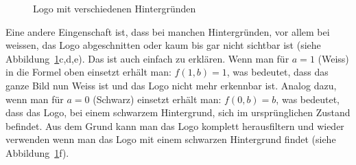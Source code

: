 \documentclass[12pt,a4paper]{report}
\begin{document}
\begin{figure}[h]
    \qquad
    \qquad
    \caption{Logo mit verschiedenen Hintergründen}%
    \label{fig:logo5}%
\end{figure}
Eine andere Eingenschaft ist, dass bei manchen Hintergründen,
vor allem bei weissen, das Logo abgeschnitten oder kaum bis gar nicht sichtbar ist (siehe Abbildung~\ref{fig:logo5}c,d,e).
Das ist auch einfach zu erklären.
Wenn man für $a = 1$ (Weiss) in die Formel oben einsetzt erhält man: $f(1, b) = 1$, was bedeutet, dass das ganze Bild nun Weiss ist und das Logo nicht mehr erkennbar ist.
Analog dazu, wenn man für $a = 0$ (Schwarz) einsetzt erhält man: $f(0, b) = b$, was bedeutet, dass das Logo, bei einem schwarzem Hintergrund,
sich im ursprünglichen Zustand befindet.
Aus dem Grund kann man das Logo komplett herausfiltern und wieder verwenden wenn man das Logo mit einem schwarzen Hintergrund findet (siehe Abbildung~\ref{fig:logo5}f).
\end{document}
